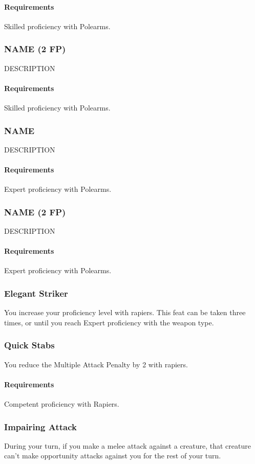     \paragraph{Requirements} Skilled proficiency with Polearms.
\subsubsection{NAME (2 FP)} \label{feat::name}
    DESCRIPTION
    \paragraph{Requirements} Skilled proficiency with Polearms.
\subsubsection{NAME} \label{feat::name}
    DESCRIPTION
    \paragraph{Requirements} Expert proficiency with Polearms.
\subsubsection{NAME (2 FP)} \label{feat::name}
    DESCRIPTION
    \paragraph{Requirements} Expert proficiency with Polearms.
\subsubsection{Elegant Striker} \label{feat::elegantstriker}
    You increase your proficiency level with rapiers.
    This feat can be taken three times, or until you reach Expert proficiency with the weapon type.
\subsubsection{Quick Stabs} \label{feat::quickstabs}
    You reduce the Multiple Attack Penalty by 2 with rapiers.
    \paragraph{Requirements} Competent proficiency with Rapiers.
\subsubsection{Impairing Attack} \label{feat::impairingattack}
    During your turn, if you make a melee attack against a creature, that creature can't make opportunity attacks against you for the rest of your turn.
